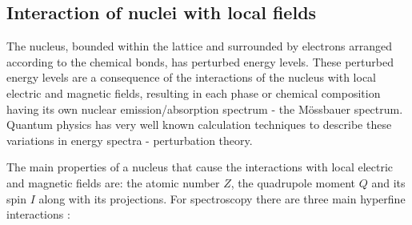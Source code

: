 
\subsection{Interaction of nuclei with local fields}
The nucleus, bounded within the lattice and surrounded by electrons arranged according to the chemical bonds, has perturbed energy levels. These perturbed energy levels are a consequence of the interactions of the nucleus with local electric and magnetic fields, resulting in each phase or chemical composition having its own nuclear emission/absorption spectrum - the Mössbauer spectrum. Quantum physics has very well known calculation techniques to describe these variations in energy spectra - perturbation theory.

\par
The main properties of a nucleus that cause the interactions with local electric and magnetic fields are: the atomic number $Z$, the quadrupole moment $Q$ and its spin $I$ along with its projections. For spectroscopy there are three main hyperfine interactions \cite{moss}:

